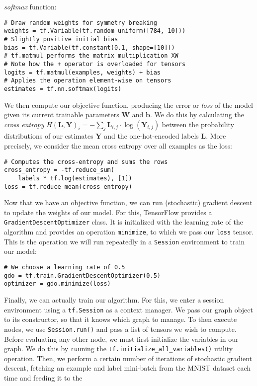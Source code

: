 \emph{softmax} function:
%
\begin{lstlisting}
# Draw random weights for symmetry breaking
weights = tf.Variable(tf.random_uniform([784, 10]))
# Slightly positive initial bias
bias = tf.Variable(tf.constant(0.1, shape=[10]))
# tf.matmul performs the matrix multiplication XW
# Note how the + operator is overloaded for tensors
logits = tf.matmul(examples, weights) + bias
# Applies the operation element-wise on tensors
estimates = tf.nn.softmax(logits)
\end{lstlisting}
%
We then compute our objective function, producing the error or \emph{loss} of
the model given its current trainable parameters $\mathbf{W}$ and
$\mathbf{b}$. We do this by calculating the \emph{cross entropy}
$H(\mathbf{L}, \mathbf{Y})_i = -\sum_j \mathbf{L}_{i,j} \cdot
\log(\mathbf{Y}_{i,j})$ between the probability distributions of our estimates
$\mathbf{Y}$ and the one-hot-encoded labels $\mathbf{L}$. More precisely, we
consider the mean cross entropy over all examples as the loss:
%
\begin{lstlisting}
# Computes the cross-entropy and sums the rows
cross_entropy = -tf.reduce_sum(
    labels * tf.log(estimates), [1])
loss = tf.reduce_mean(cross_entropy)
\end{lstlisting}
%
Now that we have an objective function, we can run (stochastic) gradient descent
to update the weights of our model. For this, TensorFlow provides a
\texttt{GradientDescentOptimizer} class. It is initialized with the
learning rate of the algorithm and provides an operation \texttt{minimize}, to
which we pass our \texttt{loss} tensor. This is the operation we will run
repeatedly in a \texttt{Session} environment to train our model:
%
\begin{lstlisting}
# We choose a learning rate of 0.5
gdo = tf.train.GradientDescentOptimizer(0.5)
optimizer = gdo.minimize(loss)
\end{lstlisting}
%
Finally, we can actually train our algorithm. For this, we enter a session
environment using a \texttt{tf.Session} as a context manager. We pass our graph
object to its constructor, so that it knows which graph to manage. To then
execute nodes, we use \texttt{Session.run()} and pass a list of tensors we wish
to compute. Before evaluating any other node, we must first initialize the
variables in our graph. We do this by \texttt{run}ning the
\texttt{tf.initialize\_all\_variables()} utility operation. Then, we perform a
certain number of iterations of stochastic gradient descent, fetching an example
and label mini-batch from the MNIST dataset each time and feeding it to the
